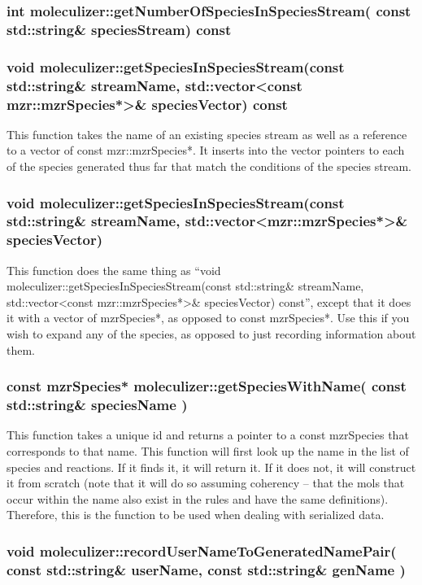\subsubsection{int moleculizer::getNumberOfSpeciesInSpeciesStream(
  const std::string\& speciesStream) const}

\subsubsection{void moleculizer::getSpeciesInSpeciesStream(const
  std::string\& streamName, std::vector<const mzr::mzrSpecies*>\&
  speciesVector) const }

This function takes the name of an existing species stream as well as
a reference to a vector of const mzr::mzrSpecies*.  It inserts into
the vector pointers to each of the species generated thus far that
match the conditions of the species stream.

\subsubsection{void moleculizer::getSpeciesInSpeciesStream(const
  std::string\& streamName, std::vector<mzr::mzrSpecies*>\&
  speciesVector) }

This function does the same thing as ``void
moleculizer::getSpeciesInSpeciesStream(const std::string\& streamName,
std::vector<const mzr::mzrSpecies*>\& speciesVector) const'', except
that it does it with a vector of mzrSpecies*, as opposed to const
mzrSpecies*.  Use this if you wish to expand any of the species, as
opposed to just recording information about them.

\subsubsection{const mzrSpecies* moleculizer::getSpeciesWithName(
  const std::string\& speciesName )}
This function takes a unique id and returns a pointer to a const
mzrSpecies that corresponds to that name.  This function will first
look up the name in the list of species and reactions.  If it finds
it, it will return it.  If it does not, it will construct it from
scratch (note that it will do so assuming coherency -- that the mols
that occur within the name also exist in the rules and have the same
definitions).  Therefore, this is the function to be used when dealing
with serialized data.  

\subsubsection{void moleculizer::recordUserNameToGeneratedNamePair(
  const std::string\& userName,  const std::string\& genName )}

